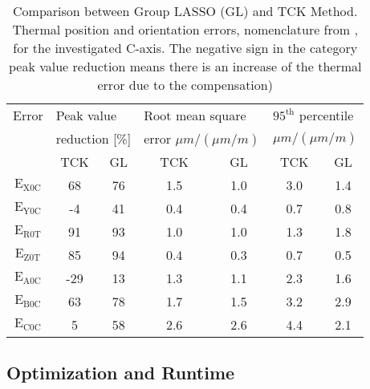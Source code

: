 \begin{table}[ht]
\centering
\begin{threeparttable}
\caption[Statistical evaluation of the data and comparison of the methods - TCK vs. GL]{Comparison between Group LASSO (GL) and TCK Method. Thermal position and orientation errors, nomenclature from \cite{Blaser_2017}, for the investigated C-axis. The negative sign in the category peak value reduction means there is an increase of the thermal error due to the compensation)}
\begin{tabular}{c c c c c c c}
\hline
Error  & \multicolumn{2}{l}{Peak value} \hspace{2cm} & \multicolumn{2}{l}{Root mean square} \hspace{2cm} & \multicolumn{2}{l}{$\mathrm{95^{th}}$ percentile} \vspace{-0.2cm} \\
 & \multicolumn{2}{l}{reduction [\%]} & \multicolumn{2}{l}{error $\mu m / (\mu m / m)$} & \multicolumn{2}{l}{$\mu m / (\mu m / m)$} \\
\hline
  & TCK & GL & TCK & GL & TCK & GL \\
  \hline \vspace{-0.2cm}
 $\mathrm{E_{X0C}}$ & 68 & 76 & 1.5 & 1.0 & 3.0 & 1.4  \\ \vspace{-0.2cm}
 $\mathrm{E_{Y0C}}$ & -4 & 41 & 0.4 & 0.4 & 0.7 & 0.8  \\ \vspace{-0.2cm}
 $\mathrm{E_{R0T}}$ & 91 & 93 & 1.0 & 1.0 & 1.3 & 1.8  \\ \vspace{-0.2cm}
 $\mathrm{E_{Z0T}}$ & 85 & 94 & 0.4 & 0.3 & 0.7 &  0.5 \\ \vspace{-0.2cm}
 $\mathrm{E_{A0C}}$ & -29 & 13 & 1.3 & 1.1 & 2.3 & 1.6  \\ \vspace{-0.2cm}
 $\mathrm{E_{B0C}}$ & 63 & 78 & 1.7 & 1.5 & 3.2 & 2.9  \\ 
 $\mathrm{E_{C0C}}$ & 5 & 58 & 2.6 & 2.6 & 4.4 & 2.1  \\ 
\hline
\end{tabular}
\label{Tab:statistic_comp}
\end{threeparttable}
\end{table}


\subsection{Optimization and Runtime}
\label{sec:opt_runtime}

